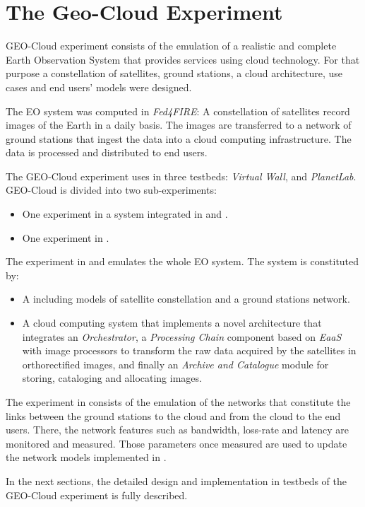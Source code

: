 
\chapter{The Geo-Cloud Experiment}
\label{chap:geocloud-experiment}
 GEO-Cloud experiment consists of the emulation of a realistic and complete Earth Observation System that provides services using cloud technology. For that purpose a constellation of satellites, ground stations, a cloud architecture, use cases and {end users' models} were designed.

The \ac{EO} system was computed in \emph{Fed4FIRE}: A constellation of
satellites record images of the Earth in a daily basis. The images are
transferred to a network of ground stations that ingest the data into a cloud computing infrastructure. The data is processed and distributed to end users.

The GEO-Cloud experiment uses in three testbeds: \emph{Virtual Wall}, \bonfire and
\emph{PlanetLab}. GEO-Cloud is divided into two sub-experiments:
\begin{itemize}
\item One experiment in a system integrated in \vw and \bonfire.
\item One experiment in \pl.
\end{itemize}

The experiment in \vw and \bonfire emulates the whole \ac{EO} system. The system is constituted by:

\begin{itemize}
\item A \sss including models of satellite constellation and a ground stations
  network.
\item A cloud computing system that implements a novel architecture that
  integrates an \emph{Orchestrator}, a \emph{Processing Chain} component
  based on \emph{EaaS}  with image processors to transform the raw data acquired
  by the satellites in orthorectified images, and finally an \emph{Archive and Catalogue}
  module for storing, cataloging and allocating images.
\end{itemize}

The experiment in \pl consists of the emulation of the networks that constitute
the links between the ground stations to the cloud and from the cloud to the end
users. There, the network features such as bandwidth, loss-rate and latency are monitored and measured. Those parameters once measured are used to update the
network models implemented in \vw.

In the next sections, the detailed design and implementation in testbeds of the GEO-Cloud experiment is fully
described. 









%

%




